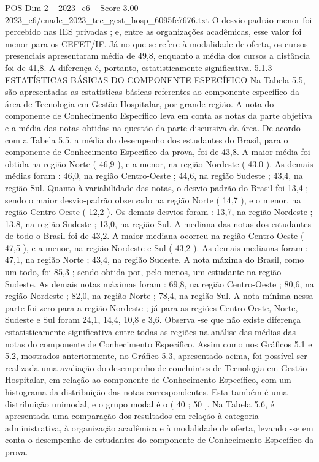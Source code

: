 \begin{textsample}{POS Dim 2 – 2023\_c6 – Score 3.00 – 2023\_c6/enade\_2023\_tec\_gest\_hosp\_6095fc7676.txt}
O desvio-padrão menor foi percebido nas IES privadas ; e, entre as organizações acadêmicas, esse valor foi menor para os CEFET/IF.
Já no que se refere à modalidade de oferta, os cursos presenciais apresentaram média de 49,8, enquanto a média dos cursos a distância foi de 41,8.
A diferença é, portanto, estatisticamente significativa. 5.1.3 ESTATÍSTICAS BÁSICAS DO COMPONENTE ESPECÍFICO Na Tabela 5.5, são apresentadas as estatísticas básicas referentes ao componente específico da área de Tecnologia em Gestão Hospitalar, por grande região.
A nota do componente de Conhecimento Específico leva em conta as notas da parte objetiva e a média das notas obtidas na questão da parte discursiva da área.
De acordo com a Tabela 5.5, a média do desempenho dos estudantes do Brasil, para o componente de Conhecimento Específico da prova, foi de 43,8.
A maior média foi obtida na região Norte ( 46,9 ), e a menor, na região Nordeste ( 43,0 ).
As demais médias foram : 46,0, na região Centro-Oeste ; 44,6, na região Sudeste ; 43,4, na região Sul.
Quanto à variabilidade das notas, o desvio-padrão do Brasil foi 13,4 ; sendo o maior desvio-padrão observado na região Norte ( 14,7 ), e o menor, na região Centro-Oeste ( 12,2 ).
Os demais desvios foram : 13,7, na região Nordeste ; 13,8, na região Sudeste ; 13,0, na região Sul.
A mediana das notas dos estudantes de todo o Brasil foi de 43,2.
A maior mediana ocorreu na região Centro-Oeste ( 47,5 ), e a menor, na região Nordeste e Sul ( 43,2 ).
As demais medianas foram : 47,1, na região Norte ; 43,4, na região Sudeste.
A nota máxima do Brasil, como um todo, foi 85,3 ; sendo obtida por, pelo menos, um estudante na região Sudeste.
As demais notas máximas foram : 69,8, na região Centro-Oeste ; 80,6, na região Nordeste ; 82,0, na região Norte ; 78,4, na região Sul.
A nota mínima nessa parte foi zero para a região Nordeste ; já para as regiões Centro-Oeste, Norte, Sudeste e Sul foram 24,1, 14,4, 10,8 e 3,6.
Observa -se que não existe diferença estatisticamente significativa entre todas as regiões na análise das médias das notas do componente de Conhecimento Específico.
Assim como nos Gráficos 5.1 e 5.2, mostrados anteriormente, no Gráfico 5.3, apresentado acima, foi possível ser realizada uma avaliação do desempenho de concluintes de Tecnologia em Gestão Hospitalar, em relação ao componente de Conhecimento Específico, com um histograma da distribuição das notas correspondentes.
Esta também é uma distribuição unimodal, e o grupo modal é o ( 40 ; 50 ].
Na Tabela 5.6, é apresentada uma comparação dos resultados em relação à categoria administrativa, à organização acadêmica e à modalidade de oferta, levando -se em conta o desempenho de estudantes do componente de Conhecimento Específico da prova.

\end{textsample}
